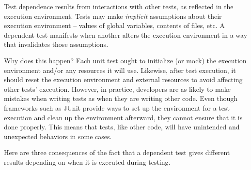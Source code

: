 
Test dependence results from interactions with other tests,
as reflected in the execution environment.
Tests may make \textit{implicit} assumptions about their
execution environment -- values of global variables,
contents of files, etc. A dependent test
manifests when another alters the execution
environment in a way that invalidates those assumptions.


Why does this happen?
Each unit test ought to initialize (or mock) the execution environment
and/or any resources it will use.
Likewise, after test execution, it should reset the
execution environment and external resources
to avoid affecting other tests' execution.
However, in practice,
developers are as likely
to make mistakes when writing tests as when they are writing other code.
Even though frameworks such as
JUnit provide ways to set up the environment for a test execution and clean
up the environment afterward,
they cannot ensure that it is done
properly. This means that tests, like other code,
will have unintended and unexpected behaviors in some cases.



%
%




Here are three consequences of the fact that a dependent
test gives different results depending on when it is executed
during testing.

